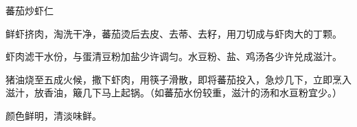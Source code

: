 \begin{recipe}{蕃茄炒虾仁}

\ingredients


\preparation

\step 鲜虾挤肉，淘洗干净，蕃茄烫后去皮、去蒂、去籽，用刀切成与虾肉大的丁颗。

\step 虾肉滤干水份，与蛋清豆粉加盐少许调匀。水豆粉、盐、鸡汤各少许兑成滋汁。

\step 猪油烧至五成火候，撒下虾肉，用筷子滑散，即将蕃茄投入，急炒几下，立即烹入
滋汁，放香油，簸几下马上起锅。（如蕃茄水份较重，滋汁的汤和水亘粉宜少。）

\features

颜色鲜明，清淡味鲜。

\end{recipe}

